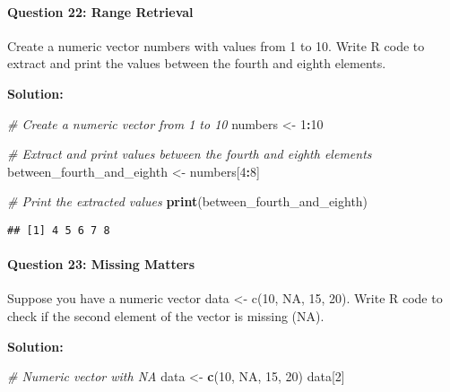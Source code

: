 \documentclass[
]{article}
\newenvironment{Shaded}{\begin{snugshade}}{\end{snugshade}}
\newcommand{\CommentTok}[1]{\textcolor[rgb]{0.56,0.35,0.01}{\textit{#1}}}
\newcommand{\ConstantTok}[1]{\textcolor[rgb]{0.56,0.35,0.01}{#1}}
\newcommand{\DecValTok}[1]{\textcolor[rgb]{0.00,0.00,0.81}{#1}}
\newcommand{\FunctionTok}[1]{\textcolor[rgb]{0.13,0.29,0.53}{\textbf{#1}}}
\newcommand{\NormalTok}[1]{#1}
\newcommand{\OtherTok}[1]{\textcolor[rgb]{0.56,0.35,0.01}{#1}}
\newcommand{\SpecialCharTok}[1]{\textcolor[rgb]{0.81,0.36,0.00}{\textbf{#1}}}
\begin{document}
\hypertarget{question-22-range-retrieval}{%
\paragraph{Question 22: Range
Retrieval}\label{question-22-range-retrieval}}

Create a numeric vector numbers with values from 1 to 10. Write R code
to extract and print the values between the fourth and eighth elements.

\textbf{Solution:}

\begin{Shaded}
\begin{Highlighting}[]
\CommentTok{\# Create a numeric vector from 1 to 10}
\NormalTok{numbers }\OtherTok{\textless{}{-}} \DecValTok{1}\SpecialCharTok{:}\DecValTok{10}

\CommentTok{\# Extract and print values between the fourth and eighth elements}
\NormalTok{between\_fourth\_and\_eighth }\OtherTok{\textless{}{-}}\NormalTok{ numbers[}\DecValTok{4}\SpecialCharTok{:}\DecValTok{8}\NormalTok{]}

\CommentTok{\# Print the extracted values}
\FunctionTok{print}\NormalTok{(between\_fourth\_and\_eighth)}
\end{Highlighting}
\end{Shaded}

\begin{verbatim}
## [1] 4 5 6 7 8
\end{verbatim}

\hypertarget{question-23-missing-matters}{%
\paragraph{Question 23: Missing
Matters}\label{question-23-missing-matters}}

Suppose you have a numeric vector data \textless- c(10, NA, 15, 20).
Write R code to check if the second element of the vector is missing
(NA).

\textbf{Solution:}

\begin{Shaded}
\begin{Highlighting}[]
\CommentTok{\# Numeric vector with NA}
\NormalTok{data }\OtherTok{\textless{}{-}} \FunctionTok{c}\NormalTok{(}\DecValTok{10}\NormalTok{, }\ConstantTok{NA}\NormalTok{, }\DecValTok{15}\NormalTok{, }\DecValTok{20}\NormalTok{)}
\NormalTok{data[}\DecValTok{2}\NormalTok{]}
\end{Highlighting}
\end{Shaded}
\end{document}
